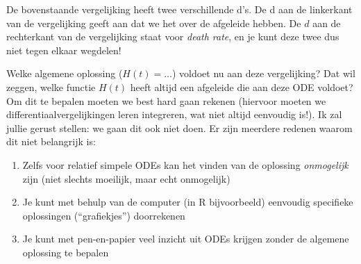 \documentclass[
  a4paper,
]{scrbook}
\providecommand{\tightlist}{%
  \setlength{\itemsep}{0pt}\setlength{\parskip}{0pt}}\usepackage{longtable,booktabs,array}
\theoremstyle{definition}
\theoremstyle{remark}
\begin{document}
\begin{tcolorbox}[enhanced jigsaw, rightrule=.15mm, opacityback=0, leftrule=.75mm, title=\textcolor{quarto-callout-important-color}{\faExclamation}\hspace{0.5em}{Let op! \(\mathrm{d}\) en \(d\) zijn niet hetzelfde!}, toptitle=1mm, titlerule=0mm, opacitybacktitle=0.6, colframe=quarto-callout-important-color-frame, breakable, colbacktitle=quarto-callout-important-color!10!white, coltitle=black, toprule=.15mm, bottomrule=.15mm, left=2mm, bottomtitle=1mm, arc=.35mm, colback=white]

De bovenstaande vergelijking heeft twee verschillende d's. De d aan de
linkerkant van de vergelijking geeft aan dat we het over de afgeleide
hebben. De \(d\) aan de rechterkant van de vergelijking staat voor
\emph{death rate}, en je kunt deze twee dus niet tegen elkaar wegdelen!

\end{tcolorbox}

Welke algemene oplossing (\(H(t)=\dots\)) voldoet nu aan deze
vergelijking? Dat wil zeggen, welke functie \(H(t)\) heeft altijd een
afgeleide die aan deze ODE voldoet? Om dit te bepalen moeten we best
hard gaan rekenen (hiervoor moeten we differentiaalvergelijkingen leren
integreren, wat niet altijd eenvoudig is!). Ik zal jullie gerust
stellen: we gaan dit ook niet doen. Er zijn meerdere redenen waarom dit
niet belangrijk is:

\begin{enumerate}
\def\labelenumi{\arabic{enumi}.}
\tightlist
\item
  Zelfs voor relatief simpele ODEs kan het vinden van de oplossing
  \emph{onmogelijk} zijn (niet slechts moeilijk, maar echt onmogelijk)
\item
  Je kunt met behulp van de computer (in R bijvoorbeeld) eenvoudig
  specifieke oplossingen (``grafiekjes'') doorrekenen
\item
  Je kunt met pen-en-papier veel inzicht uit ODEs krijgen zonder de
  algemene oplossing te bepalen
\end{enumerate}
\end{document}
